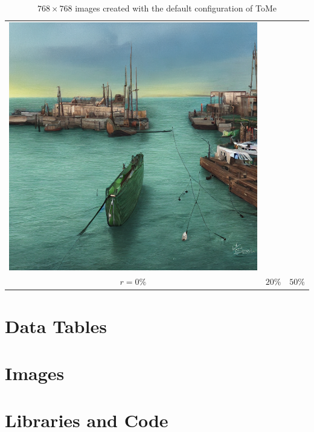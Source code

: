 \documentclass[12pt,a4paper]{article}
\begin{document}
\begin{table}[!htb]
\begin{tabular}{c c c}
    \includegraphics[width=0.3\linewidth]{static/sample_imgs/main/boat_50.png}\\
    \(r=0\%\) & \(20\%\) & \(50\%\) \\
\end{tabular}
\caption{$768 \times 768$ images created with the default configuration of ToMe}
\end{table}

%

\newpage














\newpage
\appendix
{}
\section{Data Tables}


\newpage
\section{Images}


\newpage
\section{Libraries and Code}

\\


\newpage
\let\Section\section 
\def\section*#1{\Section{#1}} 


\end{document}
